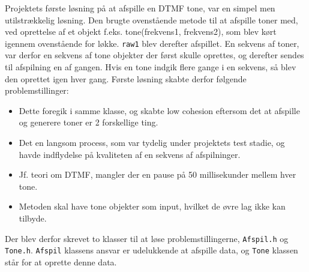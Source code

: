 Projektets første løsning på at afspille en DTMF tone, var en simpel men utilstrækkelig løsning. Den brugte ovenstående metode til at afspille toner med, ved oprettelse af et objekt f.eks. tone(frekvens1, frekvens2), som blev kørt igennem ovenstående for løkke. \texttt{raw1} blev derefter afspillet. En sekvens af toner, var derfor en sekvens af tone objekter der først skulle oprettes, og derefter sendes til afspilning en af gangen. Hvis en tone indgik flere gange i en sekvens, så blev den oprettet igen hver gang. Første løsning skabte derfor følgende problemstillinger:
\begin{itemize}
	\item Dette foregik i samme klasse, og skabte low cohesion eftersom det at afspille og generere toner er 2 forskellige ting.
	
	\item Det en langsom process, som var tydelig under projektets test stadie, og havde indflydelse på kvaliteten af en sekvens af afspilninger.
	
	\item Jf. teori om DTMF, mangler der en pause på 50 millisekunder mellem hver tone.
	
	\item Metoden skal have tone objekter som input, hvilket de øvre lag ikke kan tilbyde.
\end{itemize}
Der blev derfor skrevet to klasser til at løse problemstillingerne, \texttt{Afspil.h} og \texttt{Tone.h}. \texttt{Afspil} klassens ansvar er udelukkende at afspille data, og \texttt{Tone} klassen står for at oprette denne data.

